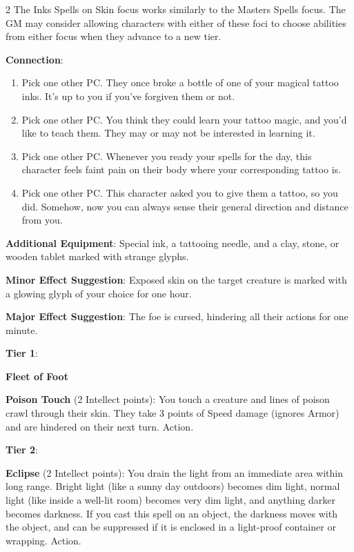 \begin{multicols}{2}
The Inks Spells on Skin focus works similarly to the Masters Spells focus. The GM may consider allowing characters with either of these foci to choose abilities from either focus when they advance to a new tier.

\textbf{Connection}:
\begin{enumerate}
\item Pick one other PC. They once broke a bottle of one of your magical tattoo inks. It’s up to you if you’ve forgiven them or not.
\item Pick one other PC. You think they could learn your tattoo magic, and you’d like to teach them. They may or may not be interested in learning it.
\item Pick one other PC. Whenever you ready your spells for the day, this character feels faint pain on their body where your corresponding tattoo is.
\item Pick one other PC. This character asked you to give them a tattoo, so you did. Somehow, now you can always sense their general direction and distance from you.
\end{enumerate}

\textbf{Additional Equipment}: Special ink, a tattooing needle, and a clay, stone, or wooden tablet marked with strange glyphs.

\textbf{Minor Effect Suggestion}: Exposed skin on the target creature is marked with a glowing glyph of your choice for one hour.

\textbf{Major Effect Suggestion}: The foe is cursed, hindering all their actions for one minute.

\textbf{Tier 1}:

\textbf{Fleet of Foot}

\textbf{Poison Touch} (2 Intellect points): You touch a creature and lines of poison crawl through their skin. They take 3 points of Speed damage (ignores Armor) and are hindered on their next turn. Action.

\textbf{Tier 2}:

\textbf{Eclipse} (2 Intellect points): You drain the light from an immediate area within long range. Bright light (like a sunny day outdoors) becomes dim light, normal light (like inside a well-lit room) becomes very dim light, and anything darker becomes darkness. If you cast this spell on an object, the darkness moves with the object, and can be suppressed if it is enclosed in a light-proof container or wrapping. Action.


\end{multicols}
